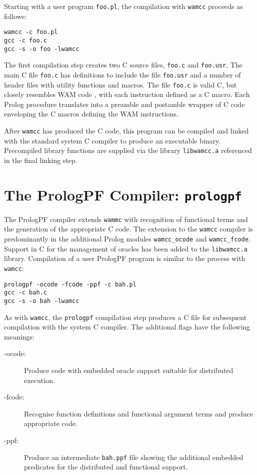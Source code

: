 Starting with a user program \texttt{foo.pl}, the compilation with \texttt{wamcc}
proceeds as follows:
\begin{verbatim}
wamcc -c foo.pl
gcc -c foo.c
gcc -s -o foo -lwamcc
\end{verbatim}
The first compilation step creates two C source files, \texttt{foo.c} and
\texttt{foo.usr}.  The main C file \texttt{foo.c} has definitions to
include the file \texttt{foo.usr} and a number of header files with utility
functions and macros.  The file \texttt{foo.c} is valid C, but closely
resembles WAM code \cite{War83}, with each instruction defined as a C macro.
Each Prolog procedure translates into a preamble and postamble wrapper of C code
enveloping the C macros defining the WAM instructions.

After \texttt{wamcc} has produced the C code, this program can be compiled and
linked with the standard system C compiler to produce an executable binary.
Precompiled library functions are supplied via the library \texttt{libwamcc.a}
referenced in the final linking step.

\section{The PrologPF Compiler: \texttt{prologpf}} %

The PrologPF compiler extends \texttt{wammc} with recognition of functional terms
and the generation of the appropriate C code.  The extension to the
\texttt{wamcc} compiler is predominantly in the additional Prolog modules
\texttt{wamcc\_{}ocode} and \texttt{wamcc\_{}fcode}.  Support in C for the management of
oracles has been added to the \texttt{libwamcc.a} library.  Compilation of a user
PrologPF program is similar to the process with \texttt{wamcc}:
\begin{verbatim}
prologpf -ocode -fcode -ppf -c bah.pl
gcc -c bah.c
gcc -s -o bah -lwamcc
\end{verbatim}
As with \texttt{wamcc}, the \texttt{prologpf} compilation step produces a C
file for subsequent compilation with the system C compiler.
The additional flags have the following meanings:
\begin{description}
\item[-ocode: ]{Produce code with embedded oracle support suitable for distributed
  execution.}
\item[-fcode: ]{Recognise function definitions and functional argument terms and
  produce appropriate code.}
\item[-ppf: ]{Produce an intermediate \texttt{bah.ppf} file showing the additional
  embedded predicates for the distributed and functional support.}
\end{description}

